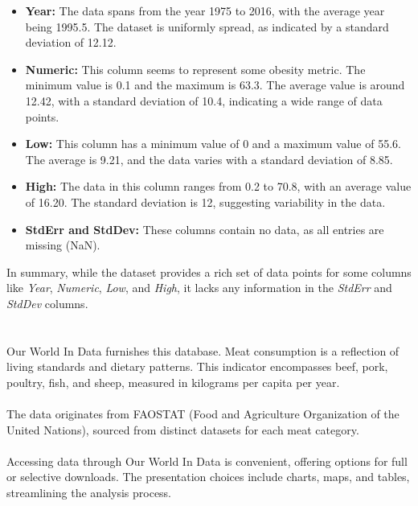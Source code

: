                 \begin{itemize}
                        \item \textbf{Year:} The data spans from the year 1975 to 2016, with the average year being 1995.5. The dataset is uniformly spread, as indicated by a standard deviation of 12.12.

                        \item \textbf{Numeric:} This column seems to represent some obesity metric. The minimum value is 0.1 and the maximum is 63.3. The average value is around 12.42, with a standard deviation of 10.4, indicating a wide range of data points.

                        \item \textbf{Low:} This column has a minimum value of 0 and a maximum value of 55.6. The average is 9.21, and the data varies with a standard deviation of 8.85.

                        \item \textbf{High:} The data in this column ranges from 0.2 to 70.8, with an average value of 16.20. The standard deviation is 12, suggesting variability in the data.

                        \item \textbf{StdErr and StdDev:} These columns contain no data, as all entries are missing (NaN).
                \end{itemize}

                In summary, while the dataset provides a rich set of data points for some columns like \textit{Year}, \textit{Numeric}, \textit{Low}, and \textit{High}, it lacks any information in the \textit{StdErr} and \textit{StdDev} columns.


    \section{\dsMeat}

        \subsection{\duCollectInitialData}
            Our World In Data furnishes this database. Meat consumption is a reflection of living standards and dietary patterns. This indicator encompasses beef, pork, poultry, fish, and sheep, measured in kilograms per capita per year.
            \\
            \\
            The data originates from FAOSTAT (Food and Agriculture Organization of the United Nations), sourced from distinct datasets for each meat category.
            \\
            \\
            Accessing data through Our World In Data is convenient, offering options for full or selective downloads. The presentation choices include charts, maps, and tables, streamlining the analysis process.


